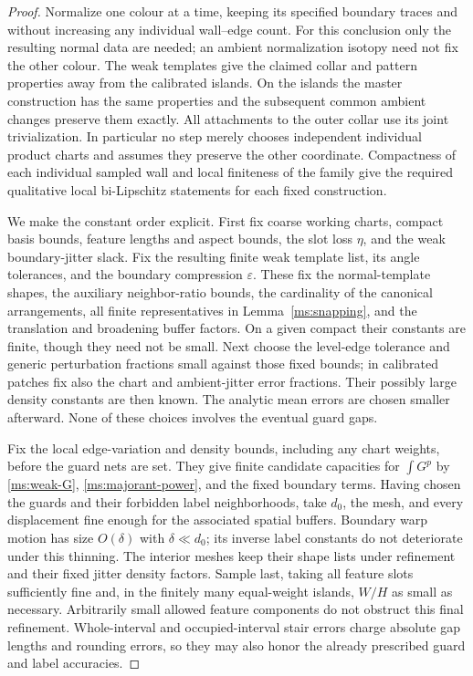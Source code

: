 \documentclass[11pt]{article}
\numberwithin{equation}{section}
\theoremstyle{definition}
\theoremstyle{remark}
\begin{document}
\begin{proof}
Normalize one colour at a time, keeping its specified boundary
traces and without increasing any individual wall--edge count.  For this
conclusion only the resulting normal data
are needed; an ambient normalization isotopy need not fix the
other colour.  The weak templates give the claimed collar and
pattern properties away from the calibrated islands.  On the
islands the master construction has the same properties and
the subsequent common ambient changes preserve them exactly.
All attachments to the outer collar use its joint trivialization.
In particular no step merely chooses independent individual
product charts and assumes they preserve the other coordinate.
Compactness of each individual sampled wall and local
finiteness of the family give the required qualitative local
bi-Lipschitz statements for each fixed construction.

We make the constant order explicit.  First fix coarse working
charts, compact basis bounds, feature lengths and aspect bounds,
the slot loss $\eta$, and the weak boundary-jitter slack.  Fix
the resulting finite weak template list, its angle tolerances,
and the boundary compression $\varepsilon$.  These fix the
normal-template shapes, the auxiliary neighbor-ratio bounds,
the cardinality of the canonical arrangements, all finite
representatives in Lemma~\ref{ms:snapping}, and the translation and
broadening buffer factors.  On a given compact their constants
are finite, though they need not be small.  Next choose the
level-edge tolerance and generic perturbation fractions small
against those fixed bounds; in calibrated patches fix also the
chart and ambient-jitter error fractions.  Their possibly large
density constants are then known.  The analytic mean errors
are chosen smaller afterward.  None of these choices involves
the eventual guard gaps.

Fix the local edge-variation and density bounds, including any
chart weights, before the guard nets are set.  They give finite
candidate capacities for $\int G^p$ by
\eqref{ms:weak-G}, \eqref{ms:majorant-power}, and the fixed
boundary terms.  Having chosen the guards and their forbidden
label neighborhoods, take $d_0$, the mesh, and every displacement
fine enough for the associated spatial buffers.  Boundary warp
motion has size $O(\delta)$ with $\delta\ll d_0$; its inverse
label constants do not deteriorate under this thinning.  The
interior meshes keep their shape lists under refinement and
their fixed jitter density factors.  Sample last, taking all
feature slots sufficiently fine and, in the finitely many
equal-weight islands, $W/H$ as small as necessary.  Arbitrarily
small allowed feature components do not obstruct this final
refinement.  Whole-interval and occupied-interval stair errors
charge absolute gap lengths and rounding errors, so they may
also honor the already prescribed guard and label accuracies.


\end{proof}
\end{document}
